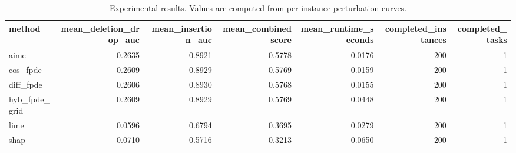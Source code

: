 \begin{table}[t]
\caption{Experimental results. Values are computed from per-instance perturbation curves.}
\label{tab:main_results_computed}
\centering
\begin{tabular}{lrrrrrr}
\toprule
method & mean\_deletion\_drop\_auc & mean\_insertion\_auc & mean\_combined\_score & mean\_runtime\_seconds & completed\_instances & completed\_tasks \\
\midrule
aime & 0.2635 & 0.8921 & 0.5778 & 0.0176 & 200 & 1 \\
cos\_fpde & 0.2609 & 0.8929 & 0.5769 & 0.0159 & 200 & 1 \\
diff\_fpde & 0.2606 & 0.8930 & 0.5768 & 0.0155 & 200 & 1 \\
hyb\_fpde\_grid & 0.2609 & 0.8929 & 0.5769 & 0.0448 & 200 & 1 \\
lime & 0.0596 & 0.6794 & 0.3695 & 0.0279 & 200 & 1 \\
shap & 0.0710 & 0.5716 & 0.3213 & 0.0650 & 200 & 1 \\
\bottomrule
\end{tabular}

\end{table}
